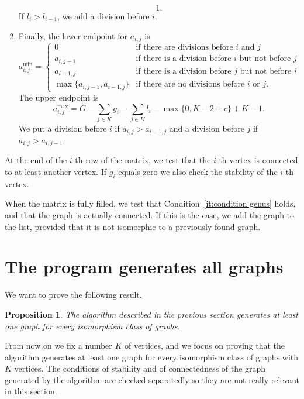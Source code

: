 \documentclass{amsart}
\theoremstyle{plain}
\newtheorem{proposition}[theorem]{Proposition}
\theoremstyle{definition}
\DeclareMathOperator{\MAX}{max}
\newcommand{\ubar}[1]{\underline{#1}}
\begin{document}
\begin{enumerate}
\[  1\text{.}
  \]
  If $l_i > l_{i-1}$, we add a division before $i$.
\item Finally, the lower endpoint for $a_{i,j}$ is
  \[
  a_{i,j}^{\min} =
  \begin{cases}
    0 & \text{if there are divisions before $i$ and $j$}\\
    a_{i,j-1} & \text{if there is a division before $i$ but not before
      $j$}\\
    a_{i-1,j} & \text{if there is a division before $j$ but not before
      $i$}\\
    \max\{a_{i,j-1}, a_{i-1,j}\} & \text{if there are no divisions
      before $i$ or $j$.}
  \end{cases}
  \]
  The upper endpoint is
  \[
  a_{i,j}^{\MAX} = G - \sum_{j \in \ubar{K}} g_i - \sum_{j \in
    \ubar{K}} l_i - \max\{0, K - 2 + c\} + K - 1\text{.}
  \]
  We put a division before $i$ if $a_{i,j} > a_{i-1,j}$ and a division
  before $j$ if $a_{i,j} > a_{i,j-1}$.
\end{enumerate}

At the end of the $i$-th row of the matrix, we test that the $i$-th
vertex is connected to at least another vertex. If $g_i$ equals zero
we also check the stability of the $i$-th vertex.

When the matrix is fully filled, we test that
Condition~\ref{it:condition genus} holds, and that the graph is
actually connected. If this is the case, we add the graph to the list,
provided that it is not isomorphic to a previously found graph.



\section{The program generates all graphs}

We want to prove the following result.

\begin{proposition}\label{prop:main}
  The algorithm described in the previous section generates at least
  one graph for every isomorphism class of graphs.
\end{proposition}

From now on we fix a number $K$ of vertices, and we focus on proving
that the algorithm generates at least one graph for every isomorphism
class of graphs with $K$ vertices. The conditions of stability and of connectedness of the graph generated by the algorithm are checked separatedly so they are not really relevant in this section.
\end{document}
